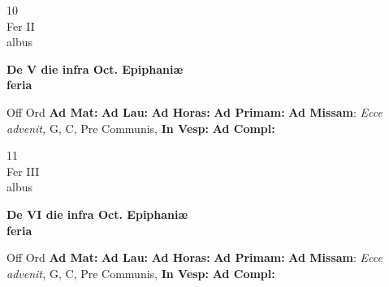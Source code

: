 \documentclass[10pt, openany]{book}
\begin{document}
    \begin{center}
        \begin{minipage}{3.5in}
            \vspace{2em}
            \begin{minipage}{0.5in}
                {\Huge 10} \\
                {\normalsize Fer II} \\
                {\normalsize albus}
            \end{minipage}
            \begin{minipage}{3.0in}
                \textbf{ \large De V die infra Oct. Epiphaniæ \\
                \textnormal{\normalsize feria}} \\ 
            \end{minipage}
            \begin{justify}Off Ord
                \textbf{Ad Mat: }
                \textbf{Ad Lau: }
                \textbf{Ad Horas: }
                \textbf{Ad Primam: }\textbf{Ad Missam}: \textit{Ecce advenit,} G, C, Pre Communis,  
                \textbf{In Vesp: }
                \textbf{Ad Compl: }
            \end{justify}
        \end{minipage}
    \end{center}

    \begin{center}
        \begin{minipage}{3.5in}
            \vspace{2em}
            \begin{minipage}{0.5in}
                {\Huge 11} \\
                {\normalsize Fer III} \\
                {\normalsize albus}
            \end{minipage}
            \begin{minipage}{3.0in}
                \textbf{ \large De VI die infra Oct. Epiphaniæ \\
                \textnormal{\normalsize feria}} \\ 
            \end{minipage}
            \begin{justify}Off Ord
                \textbf{Ad Mat: }
                \textbf{Ad Lau: }
                \textbf{Ad Horas: }
                \textbf{Ad Primam: }\textbf{Ad Missam}: \textit{Ecce advenit,} G, C, Pre Communis,  
                \textbf{In Vesp: }
                \textbf{Ad Compl: }
            \end{justify}
        \end{minipage}
    \end{center}
\end{document}
